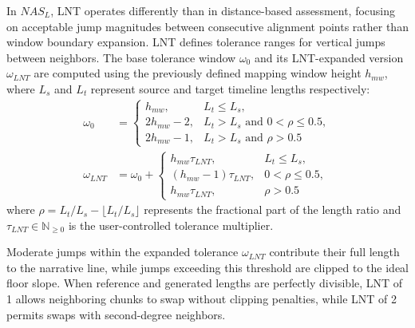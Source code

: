\documentclass[main.tex]{subfiles}
\begin{document}
In $NAS_L$, LNT operates differently than in distance-based assessment, focusing on acceptable jump magnitudes between consecutive alignment points rather than window boundary expansion. LNT defines tolerance ranges for vertical jumps between neighbors. The base tolerance window $\omega_0$ and its LNT-expanded version $\omega_{LNT}$ are computed using the previously defined mapping window height $h_{mw}$, where $L_s$ and $L_t$ represent source and target timeline lengths respectively:
\begin{align}
\omega_0 &= \begin{cases}
h_{mw}, & L_t \leq L_s, \\
2h_{mw} - 2, & L_t > L_s \text{ and } 0 < \rho \leq 0.5, \\
2h_{mw} - 1, & L_t > L_s \text{ and } \rho > 0.5
\end{cases} \\
\omega_{LNT} &= \omega_0 + \begin{cases}
h_{mw} \tau_{LNT}, & L_t \leq L_s, \\
(h_{mw} - 1) \tau_{LNT}, & 0 < \rho \leq 0.5, \\
h_{mw} \tau_{LNT}, & \rho > 0.5
\end{cases}
\end{align}
where $\rho = L_t/L_s - \lfloor L_t/L_s \rfloor$ represents the fractional part of the length ratio and $\tau_{LNT} \in \mathbb{N}_{\geq 0}$ is the user-controlled tolerance multiplier.

Moderate jumps within the expanded tolerance $\omega_{LNT}$ contribute their full length to the narrative line, while jumps exceeding this threshold are clipped to the ideal floor slope. When reference and generated lengths are perfectly divisible, LNT of 1 allows neighboring chunks to swap without clipping penalties, while LNT of 2 permits swaps with second-degree neighbors.
\end{document}
